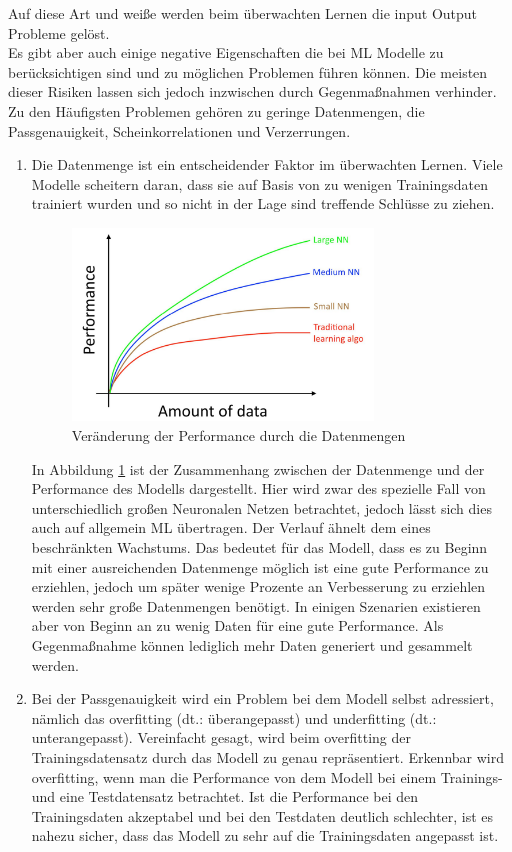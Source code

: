 \begin{onehalfspace}
        Auf diese Art und weiße werden beim überwachten Lernen die input Output Probleme gelöst.\cite{Ng2018}
        \\
        Es gibt aber auch einige negative Eigenschaften die bei \ac{ML} Modelle zu berücksichtigen sind und zu möglichen Problemen führen können. Die meisten dieser Risiken lassen sich jedoch inzwischen durch Gegenmaßnahmen verhinder. Zu den Häufigsten Problemen gehören zu geringe Datenmengen, die Passgenauigkeit, Scheinkorrelationen und Verzerrungen. 
        \begin{enumerate}
            \item Die Datenmenge ist ein entscheidender Faktor im überwachten Lernen. Viele Modelle scheitern daran, dass sie auf Basis von zu wenigen Trainingsdaten trainiert wurden und so nicht in der Lage sind treffende Schlüsse zu ziehen.\cite{Datenkommission2019}\cite{Ng2018}
            \begin{figure}[h]
                \centering
                \includegraphics[width = 8cm]{Bilder/Datenmenge.png}
                \caption{Veränderung der Performance durch die Datenmengen \cite{Ng2018}}
                \label{fig:Datavolume}
            \end{figure} 
            In Abbildung \ref*{fig:Datavolume} ist der Zusammenhang zwischen der Datenmenge und der Performance des Modells dargestellt. Hier wird zwar des spezielle Fall von unterschiedlich großen Neuronalen Netzen betrachtet, jedoch lässt sich dies auch auf allgemein \ac*{ML} übertragen. Der Verlauf ähnelt dem eines beschränkten Wachstums. Das bedeutet für das Modell, dass es zu Beginn mit einer ausreichenden Datenmenge möglich ist eine gute Performance zu erziehlen, jedoch um später wenige Prozente an Verbesserung zu erziehlen werden sehr große Datenmengen benötigt.\cite{Ng2018} In einigen Szenarien existieren aber von Beginn an zu wenig Daten für eine gute Performance. Als Gegenmaßnahme können lediglich mehr Daten generiert und gesammelt werden.
            \item Bei der Passgenauigkeit wird ein Problem bei dem Modell selbst adressiert, nämlich das overfitting (\ac*{dt}.: \glqq{}überangepasst\grqq{}) und underfitting (\ac*{dt}.: \glqq{}unterangepasst\grqq{}). Vereinfacht gesagt, wird beim overfitting der Trainingsdatensatz durch das Modell zu genau repräsentiert. Erkennbar wird overfitting, wenn man die Performance von dem Modell bei einem Trainings- und eine Testdatensatz betrachtet. Ist die Performance bei den Trainingsdaten akzeptabel und bei den Testdaten deutlich schlechter, ist es nahezu sicher, dass das Modell zu sehr auf die Trainingsdaten angepasst ist.

\end{enumerate}
\end{onehalfspace}
